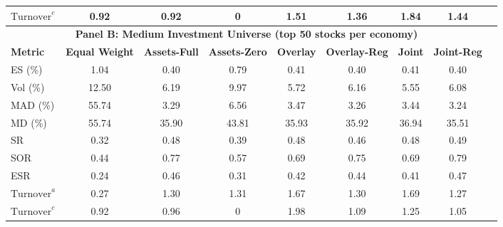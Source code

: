 \begin{table}[htbp]
{\begin{tabular}{lcccccccc}
    $\text{Turnover}^c$       & 0.92                  & 0.92                    & 0                 & 1.51                 & 1.36             & 1.84              & 1.44               \\
    \midrule
    \multicolumn{8}{c}{\textbf{Panel B: Medium Investment Universe (top 50 stocks per economy)}} \\
    \midrule
    \textbf{Metric} & \textbf{Equal Weight} & \textbf{Assets-Full} & \textbf{Assets-Zero} & \textbf{Overlay} & \textbf{Overlay-Reg} & \textbf{Joint} & \textbf{Joint-Reg}\\
    \midrule
    ES (\%)                 & 1.04                        & 0.40                 & 0.79                & 0.41                & 0.40             & 0.41             & 0.40                \\
    Vol (\%)                & 12.50                       & 6.19                 & 9.97                & 5.72                & 6.16             & 5.55             & 6.08               \\
    MAD (\%)                & 55.74                       & 3.29                 & 6.56                & 3.47                & 3.26             & 3.44             & 3.24               \\
    MD (\%)                 & 55.74                       & 35.90                & 43.81               & 35.93               & 35.92            & 36.94            & 35.51               \\
    SR                      & 0.32                        & 0.48                 & 0.39                & 0.48                & 0.46             & 0.48             & 0.49               \\
    SOR                     & 0.44                        & 0.77                 & 0.57                & 0.69                & 0.75             & 0.69             & 0.79               \\
    ESR                     & 0.24                        & 0.46                 & 0.31                & 0.42                & 0.44             & 0.41             & 0.47               \\
    $\text{Turnover}^a$     & 0.27                        & 1.30                 & 1.31                & 1.67                & 1.30             & 1.69             & 1.27               \\
    $\text{Turnover}^c$     & 0.92                        & 0.96                 & 0                   & 1.98                & 1.09             & 1.25             & 1.05               \\

\end{tabular}}
\end{table}
